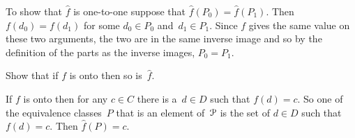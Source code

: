 \documentclass{test}  %
\begin{document}
\begin{problem}
\begin{exes}
\begin{answer}
  To show that $\hat{f}$ is one-to-one suppose that $\hat{f}(P_0)=\hat{f}(P_1)$.
  Then $f(d_0)=f(d_1)$ for some $d_0\in P_0$ and~$d_1\in P_1$.
  Since $f$ gives the same value on these two arguments,
  the two are in the same inverse image and so  
  by the definition of the parts as the inverse images,
  $P_0=P_1$.  
\end{answer}
\begin{exercise} 
  Show that if $f$ is onto then so is~$\hat{f}$.
\end{exercise}
\begin{answer}
  If $f$ is onto then for any $c\in C$ there is a~$d\in D$
  such that $f(d)=c$.
  So one of the equivalence classes~$P$ that is an element of~$\EuScript{P}$ 
  is the set of 
  $d\in D$ such that $f(d)=c$.
  Then $\hat{f}(P)=c$.  
\end{answer}
\end{exes}


\end{problem}
\end{document}
